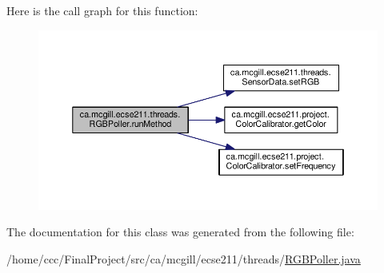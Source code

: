 Here is the call graph for this function\+:
\nopagebreak
\begin{figure}[H]
\begin{center}
\leavevmode
\includegraphics[width=350pt]{classca_1_1mcgill_1_1ecse211_1_1threads_1_1_r_g_b_poller_a96db4561c87136de5098497fe30356fe_cgraph}
\end{center}
\end{figure}


The documentation for this class was generated from the following file\+:\begin{DoxyCompactItemize}
\item 
/home/ccc/\+Final\+Project/src/ca/mcgill/ecse211/threads/\hyperlink{_r_g_b_poller_8java}{R\+G\+B\+Poller.\+java}\end{DoxyCompactItemize}
